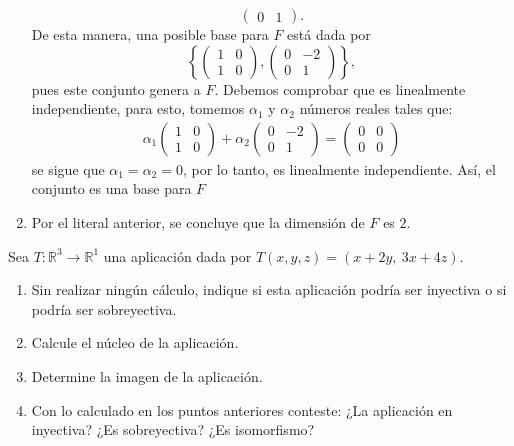 \documentclass[11pt,a5]{aleph-examen}
\begin{document}
\begin{preguntas}
\begin{respuesta}
\begin{enumerate}
\[\begin{pmatrix}
                0 & 1
            \end{pmatrix}.
        \]
        De esta manera, una posible base para $F$ está dada por 
        \[
            \left\{ \begin{pmatrix}
                1 & 0 \\
                1 & 0 
            \end{pmatrix},\begin{pmatrix}
                0 & -2 \\
                0 & 1
            \end{pmatrix} \right\},
        \]
        pues este conjunto genera a $F$. Debemos comprobar que es linealmente independiente, para esto, tomemos $\alpha_1$ y $\alpha_2$ números reales tales que:
        \begin{align*}
            \alpha_1\begin{pmatrix}
                1 & 0 \\
                1 & 0 
            \end{pmatrix}+\alpha_2\begin{pmatrix}
                0 & -2 \\
                0 & 1
            \end{pmatrix}
            = \begin{pmatrix}
                0 & 0 \\
                0 & 0
            \end{pmatrix}
        \end{align*}
        se sigue que $\alpha_1=\alpha_2=0$, por lo tanto, es linealmente independiente. Así, el conjunto es una base para $F$
    \item 
        Por el literal anterior, se concluye que la dimensión de $F$ es $2$. \qedhere
\end{enumerate}
\end{respuesta}


\item
    Sea $T: \mathbb{R}^3 \to \mathbb{R}^1$ una aplicación dada por $T(x,y,z) = (x+2y,\ 3x+4z)$.    \begin{enumerate}
    \item 
        Sin realizar ningún cálculo, indique si esta aplicación podría ser inyectiva o si podría ser sobreyectiva.
    \item 
        Calcule el núcleo de la aplicación. 
    \item 
        Determine la imagen de la aplicación. 
    \item 
        Con lo calculado en los puntos anteriores conteste: ¿La aplicación en inyectiva? ¿Es sobreyectiva? ¿Es isomorfismo? 
    \end{enumerate}


\end{preguntas}
\end{document}
